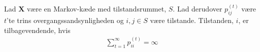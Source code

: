 

\begin{minipage}\textwidth
\begin{thmx}\label{tilbagevendende} \textbf{} %
\newline
Lad $\bm X$ være en Markov-kæde med tilstandsrummet, $S$. Lad derudover $p_{ij}^{(t)}$ være $t$'te trins overgangssandsynligheden og $i,j \in S$ være tilstande. Tilstanden, $i$, er tilbagevendende, hvis
\begin{align*}
 \sum_{t=1}^\infty p_{ii}^{(t)}=\infty
\end{align*}
\end{thmx}
\end{minipage}

